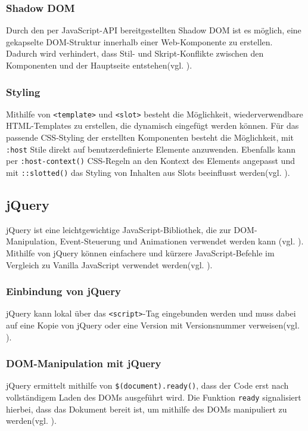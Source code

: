 \documentclass[oneside]{ausarbeitung}
\begin{document}
\subsubsection{Shadow DOM}
Durch den per JavaScript-API bereitgestellten Shadow DOM ist es möglich, eine gekapselte DOM-Struktur innerhalb einer Web-Komponente zu erstellen. Dadurch wird verhindert, dass Stil- und Skript-Konflikte zwischen den Komponenten und der Hauptseite entstehen(vgl. \parencite{webcomponents}).

\subsubsection{Styling}
Mithilfe von \texttt{<template>} und \texttt{<slot>} besteht die Möglichkeit, wiederverwendbare HTML-Templates zu erstellen, die dynamisch eingefügt werden können. Für das passende CSS-Styling der erstellten Komponenten besteht die Möglichkeit, mit \texttt{:host} Stile direkt auf benutzerdefinierte Elemente anzuwenden. Ebenfalls kann per \texttt{:host-context()} CSS-Regeln an den Kontext des Elements angepasst und mit \texttt{::slotted()} das Styling von Inhalten aus Slots beeinflusst werden(vgl. \parencite{webcomponents}).


\subsection{jQuery}
jQuery ist eine leichtgewichtige JavaScript-Bibliothek, die zur DOM-Manipulation, Event-Steuerung und Animationen verwendet werden kann (vgl. \parencite{jquery_api}).  
Mithilfe von jQuery können einfachere und kürzere JavaScript-Befehle im Vergleich zu Vanilla JavaScript verwendet werden(vgl. \parencite{jquery-api}).  

\subsubsection{Einbindung von jQuery}
jQuery kann lokal über das \texttt{\textless script\textgreater}-Tag eingebunden werden und muss dabei auf eine Kopie von jQuery oder eine Version mit Versionsnummer verweisen(vgl. \parencite{jquery_api}).  

\subsubsection{DOM-Manipulation mit jQuery}
jQuery ermittelt mithilfe von \texttt{\$(document).ready()}, dass der Code erst nach vollständigem Laden des DOMs ausgeführt wird. Die Funktion \texttt{ready} signalisiert hierbei, dass das Dokument bereit ist, um mithilfe des DOMs manipuliert zu werden(vgl. \parencite{jquery_api}).  
\end{document}
